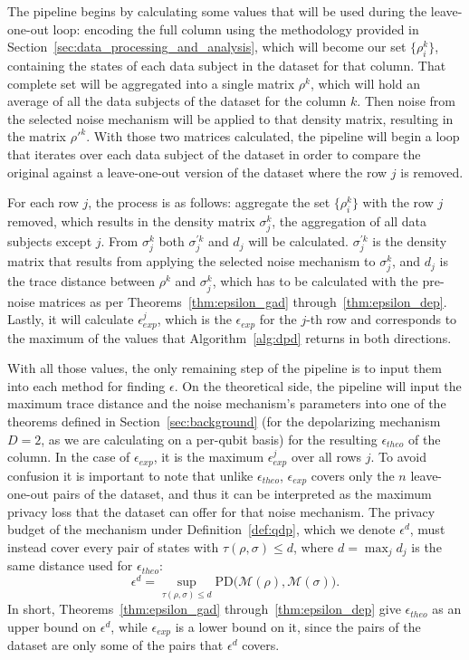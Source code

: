\documentclass{ieeeaccess}
\begin{document}
The pipeline begins by calculating some values that will be used during the leave-one-out loop: encoding the full column using the methodology provided in Section~\ref{sec:data_processing_and_analysis}, which will become our set $\{\rho_i^{k}\}$, containing the states of each data subject in the dataset for that column. That complete set will be aggregated into a single matrix $\rho^{k}$, which will hold an average of all the data subjects of the dataset for the column $k$. Then noise from the selected noise mechanism will be applied to that density matrix, resulting in the matrix $\rho'^{k}$. With those two matrices calculated, the pipeline will begin a loop that iterates over each data subject of the dataset in order to compare the original against a leave-one-out version of the dataset where the row $j$ is removed.

For each row $j$, the process is as follows: aggregate the set $\{\rho_i^{k}\}$ with the row $j$ removed, which results in the density matrix $\sigma_j^{k}$, the aggregation of all data subjects except $j$. From $\sigma_j^{k}$ both $\sigma_j^{\prime k}$ and $d_j$ will be calculated. $\sigma_j^{\prime k}$ is the density matrix that results from applying the selected noise mechanism to $\sigma_j^{k}$, and $d_j$ is the trace distance between $\rho^{k}$ and $\sigma_{j}^{k}$, which has to be calculated with the pre-noise matrices as per Theorems~\ref{thm:epsilon_gad} through~\ref{thm:epsilon_dep}. Lastly, it will calculate $\epsilon_{exp}^{j}$, which is the $\epsilon_{exp}$ for the $j$-th row and corresponds to the maximum of the values that Algorithm~\ref{alg:dpd} returns in both directions.

With all those values, the only remaining step of the pipeline is to input them into each method for finding $\epsilon$. On the theoretical side, the pipeline will input the maximum trace distance and the noise mechanism's parameters into one of the theorems defined in Section~\ref{sec:background} (for the depolarizing mechanism $D=2$, as we are calculating on a per-qubit basis) for the resulting $\epsilon_{theo}$ of the column. In the case of $\epsilon_{exp}$, it is the maximum $\epsilon_{exp}^{j}$ over all rows $j$. To avoid confusion it is important to note that unlike $\epsilon_{theo}$, $\epsilon_{exp}$ covers only the $n$ leave-one-out pairs of the dataset, and thus it can be interpreted as the maximum privacy loss that the dataset can offer for that noise mechanism. The privacy budget of the mechanism under Definition~\ref{def:qdp}, which we denote $\epsilon^{d}$, must instead cover every pair of states with $\tau(\rho, \sigma) \leq d$, where $d = \max_j d_j$ is the same distance used for $\epsilon_{theo}$:
\[
  \epsilon^{d} = \sup_{\tau(\rho, \sigma) \leq d} \mathrm{PD}\big(\mathcal{M}(\rho), \mathcal{M}(\sigma)\big).
\]
In short, Theorems~\ref{thm:epsilon_gad} through~\ref{thm:epsilon_dep} give $\epsilon_{theo}$ as an upper bound on $\epsilon^{d}$, while $\epsilon_{exp}$ is a lower bound on it, since the pairs of the dataset are only some of the pairs that $\epsilon^{d}$ covers.
\end{document}
